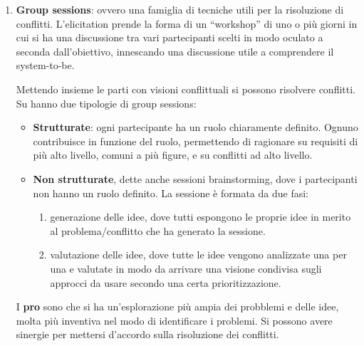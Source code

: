 \begin{itemize}
\begin{enumerate}
                  \item \textbf{Group sessions}: ovvero una famiglia di tecniche utili per
                        la risoluzione di conflitti. L'elicitation prende la forma di un “workshop”
                        di uno o più giorni in cui si ha una discussione tra vari partecipanti
                        scelti in modo oculato a seconda dall'obiettivo, innescando una discussione
                        utile a comprendere il system-to-be.

                        Mettendo insieme le parti con visioni conflittuali si possono risolvere
                        conflitti. Su hanno due tipologie di group sessions:
                        \begin{itemize}
                              \item \textbf{Strutturate}: ogni partecipante ha un ruolo chiaramente
                                    definito. Ognuno contribuisce in funzione del ruolo, permettendo di
                                    ragionare su requisiti di più alto livello, comuni a più figure, e
                                    su conflitti ad alto livello.
                              \item \textbf{Non strutturate}, dette anche sessioni brainstorming,
                                    dove i partecipanti non hanno un ruolo definito. La sessione è
                                    formata da due fasi:
                                    \begin{enumerate}
                                          \item generazione delle idee, dove tutti espongono le proprie
                                                idee in merito al problema/conflitto che ha generato la sessione.
                                          \item valutazione delle idee, dove tutte le idee vengono analizzate
                                                una per una e valutate in modo da arrivare una visione condivisa
                                                sugli approcci da usare secondo una certa prioritizzazione.
                                    \end{enumerate}
                        \end{itemize}

                        I \textbf{pro} sono che si ha un'esplorazione più ampia
                        dei probblemi e delle idee, molta più inventiva nel modo
                        di identificare i problemi. Si possono avere sinergie per
                        mettersi d'accordo sulla risoluzione dei conflitti.


\end{enumerate}
\end{itemize}
